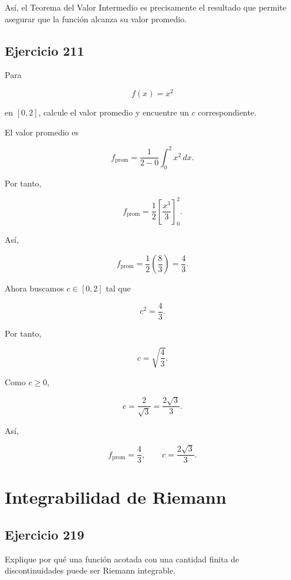 \documentclass[12pt]{article}
\begin{document}
Así, el Teorema del Valor Intermedio es precisamente el resultado que
permite asegurar que la función alcanza su valor promedio.

\subsection*{Ejercicio 211}

Para

\[
f(x)=x^2
\]

en \([0,2]\), calcule el valor promedio y encuentre un \(c\)
correspondiente.

El valor promedio es

\[
f_{\mathrm{prom}}
=
\frac{1}{2-0}
\int_0^2x^2\,dx.
\]

Por tanto,

\[
f_{\mathrm{prom}}
=
\frac12
\left[
\frac{x^3}{3}
\right]_0^2.
\]

Así,

\[
f_{\mathrm{prom}}
=
\frac12
\left(
\frac83
\right)
=
\frac43.
\]

Ahora buscamos \(c\in[0,2]\) tal que

\[
c^2=\frac43.
\]

Por tanto,

\[
c
=
\sqrt{\frac43}.
\]

Como \(c\geq0\),

\[
c
=
\frac{2}{\sqrt3}
=
\frac{2\sqrt3}{3}.
\]

Así,

\[
\boxed{
f_{\mathrm{prom}}=\frac43,
\qquad
c=\frac{2\sqrt3}{3}
}.
\]

\section*{Integrabilidad de Riemann}

\subsection*{Ejercicio 219}

Explique por qué una función acotada con una cantidad finita de
discontinuidades puede ser Riemann integrable.
\end{document}
